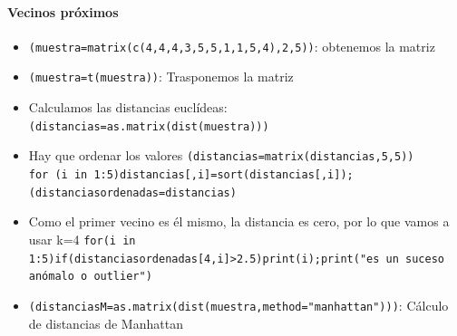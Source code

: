 \documentclass[a4paper, 12pt]{article}
\begin{document}
	\paragraph{Vecinos próximos}
	\begin{itemize}
		\item \texttt{(muestra=matrix(c(4,4,4,3,5,5,1,1,5,4),2,5))}: obtenemos la matriz
		\item \texttt{(muestra=t(muestra))}: Trasponemos la matriz
		\item Calculamos las distancias euclídeas: \texttt{(distancias=as.matrix(dist(muestra)))}
		\item Hay que ordenar los valores \texttt{(distancias=matrix(distancias,5,5))}
		\\ \texttt{for (i in 1:5){distancias[,i]=sort(distancias[,i])}; (distanciasordenadas=distancias)}
		\item Como el primer vecino es él mismo, la distancia es cero, por lo que vamos a usar k=4 \texttt{for(i in 1:5){if(distanciasordenadas[4,i]>2.5){print(i);print("es un suceso anómalo o outlier")}}}
		\item \texttt{(distanciasM=as.matrix(dist(muestra,method="manhattan")))}: Cálculo de distancias de Manhattan
	\end{itemize}
\end{document}
